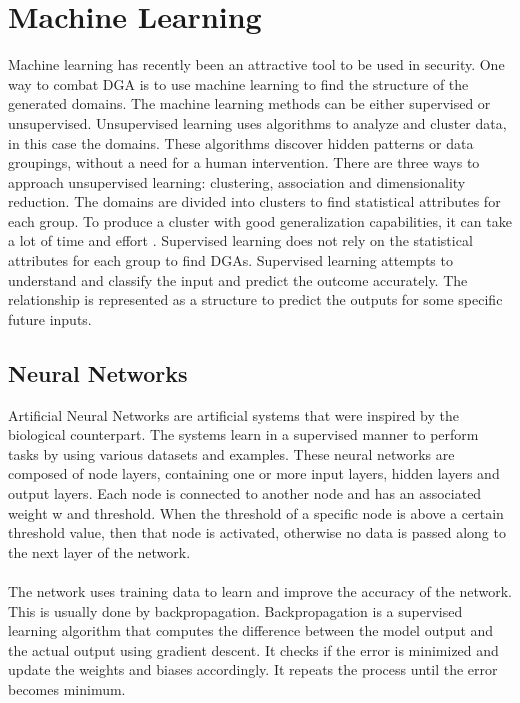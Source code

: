 \section{Machine Learning}
Machine learning has recently been an attractive tool to be used in security. One way to combat DGA is to use machine learning to find the structure of the generated domains. The machine learning methods can be either supervised or unsupervised. Unsupervised learning uses algorithms to analyze and cluster data, in this case the domains. These algorithms discover hidden patterns or data groupings, without a need for a human intervention. There are three ways to approach unsupervised learning: clustering, association and dimensionality reduction. The domains are divided into clusters to find statistical attributes for each group. To produce a cluster with good generalization capabilities, it can take a lot of time and  effort \cite{unsupervised}. Supervised learning does not rely on the statistical attributes  for each group to find DGAs. Supervised learning attempts to understand and classify the input and predict the outcome accurately. The relationship is represented as a structure to predict the outputs for some specific future inputs.  
\subsection{Neural Networks}
Artificial Neural Networks are artificial systems that were inspired by the biological counterpart. The systems learn in a supervised manner to perform tasks by using various datasets and examples. These neural networks are composed of node layers, containing one or more input layers, hidden layers and output layers. Each node is connected to another node and has an associated weight w and threshold. When the threshold of a specific node is above a certain threshold value, then that node is activated, otherwise no data is passed along to the next layer of the network. \\\\ 
The network uses training data to learn and improve the accuracy of the network. This is usually done by backpropagation. Backpropagation is a supervised learning algorithm that computes the difference between the model output and the actual output using gradient descent\cite{gradient_descent}. It checks if the error is minimized and update the weights and biases accordingly. It repeats the process until the error becomes minimum.  

